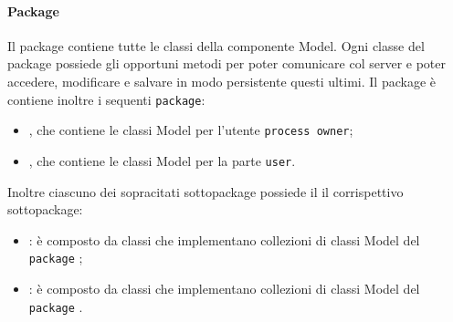\paragraph{Package \model{}}
Il package \model{} contiene tutte le classi della componente Model. Ogni classe del package \model{} possiede gli opportuni metodi per poter
comunicare col server e poter accedere, modificare e salvare in modo persistente questi ultimi.
Il package è contiene inoltre i sequenti \texttt{package}:
\begin{itemize}
	\item \modelAdmin, che contiene le classi Model per l'utente \texttt{process owner};
	\item \modelUser, che contiene le classi Model per la parte \texttt{user}.
\end{itemize}
Inoltre ciascuno dei sopracitati sottopackage possiede il il corrispettivo sottopackage:
\begin{itemize}
	\item \collectionu: è composto da classi che implementano collezioni di classi Model del \texttt{package} \modelUser;
	\item \collectionp: è composto da classi che implementano collezioni di classi Model del \texttt{package} \modelAdmin.
\end{itemize} 